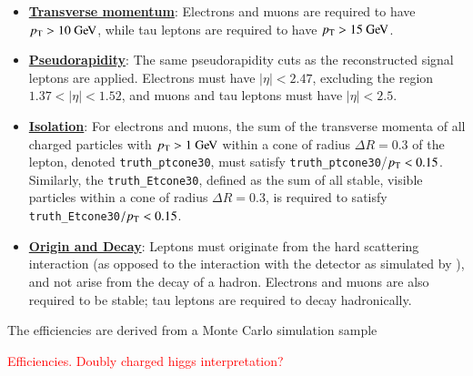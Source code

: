 \begin{itemize}
	\item \underline{\textbf{Transverse momentum}}: Electrons and muons are required to have $\pt>10 \GeV$, while tau leptons are required to have $\pt>15 \GeV$.
	\item \underline{\textbf{Pseudorapidity}}: The same pseudorapidity cuts as the reconstructed signal leptons are applied. Electrons must have $|\eta|<2.47$, excluding the region $1.37<|\eta|<1.52$, and muons and tau leptons must have $|\eta|<2.5$.
	\item \underline{\textbf{Isolation}}: For electrons and muons, the sum of the transverse momenta of all charged particles with $\pt>1 \GeV$ within a cone of radius $\Delta R=0.3$ of the lepton, denoted \texttt{truth\_ptcone30}, must satisfy \texttt{truth\_ptcone30}/$p_{\text{T}}<0.15$. Similarly, the \texttt{truth\_Etcone30}, defined as the sum of all stable, visible particles within a cone of radius $\Delta R=0.3$, is required to satisfy \texttt{truth\_Etcone30}$/p_{\text{T}}<0.15$.
	\item \underline{\textbf{Origin and Decay}}: Leptons must originate from the hard scattering interaction (as opposed to the interaction with the detector as simulated by \geant), and not arise from the decay of a hadron. Electrons and muons are also required to be stable; tau leptons are required to decay hadronically. 
\end{itemize}

The efficiencies are derived from a Monte Carlo simulation sample 

\textcolor{red}{Efficiencies. Doubly charged higgs interpretation?}

\printbibliography